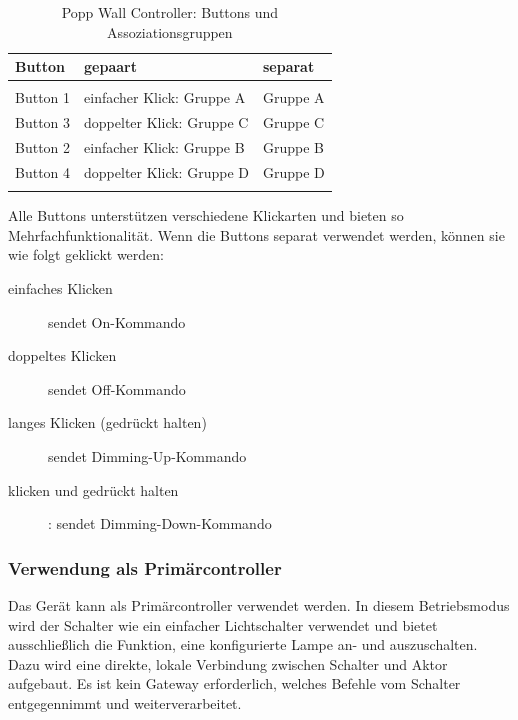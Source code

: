 \begin{longtabu} to 
	\hline
	\textbf{Button} &
	\textbf{gepaart} &
	\textbf{separat} \\
	\hline
	\endhead
	  \\
	\endfoot
	\endlastfoot
	
	Button 1 		& einfacher Klick: Gruppe A & Gruppe A \\
	 
	Button 3		& doppelter Klick: Gruppe C & Gruppe C \\
	\hline
	Button 2		& einfacher Klick: Gruppe B & Gruppe B \\
	 
	Button 4		& doppelter Klick: Gruppe D & Gruppe D \\
	\hline
	
	\caption{Popp Wall Controller: Buttons und Assoziationsgruppen}
\end{longtabu}

Alle Buttons unterstützen verschiedene Klickarten und bieten so Mehrfachfunktionalität. Wenn die Buttons separat verwendet werden, können sie wie folgt geklickt werden:

\begin{description}
	\item [einfaches Klicken] sendet On-Kommando
	\item [doppeltes Klicken] sendet Off-Kommando
	\item [langes Klicken (gedrückt halten)] sendet Dimming-Up-Kommando
	\item [klicken und gedrückt halten]: sendet Dimming-Down-Kommando
\end{description}

\subsubsection{Verwendung als Primärcontroller}
Das Gerät kann als Primärcontroller verwendet werden. In diesem Betriebsmodus wird der Schalter wie ein einfacher Lichtschalter verwendet und bietet ausschließlich die Funktion, eine konfigurierte Lampe an- und auszuschalten. Dazu wird eine direkte, lokale Verbindung zwischen Schalter und Aktor aufgebaut. Es ist kein Gateway erforderlich, welches Befehle vom Schalter entgegennimmt und weiterverarbeitet.

